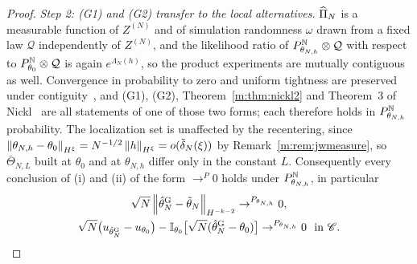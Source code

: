 \begin{proof}
\emph{Step 2: (G1) and (G2) transfer to the local alternatives.} $\widehat\Pi_N$ is a measurable function of $Z^{(N)}$ and of simulation randomness $\omega$ drawn from a fixed law $\mathcal Q$ independently of $Z^{(N)}$, and the likelihood ratio of $P^{\mathbb{N}}_{\theta_{N,h}}\otimes\mathcal Q$ with respect to $P^{\mathbb{N}}_{\theta_0}\otimes\mathcal Q$ is again $e^{\Lambda_N(h)}$, so the product experiments are mutually contiguous as well. Convergence in probability to zero and uniform tightness are preserved under contiguity~\cite[Section~6.2]{vandervaart1998}, and (G1), (G2), Theorem~\ref{m:thm:nickl2} and Theorem~3 of Nickl~\cite{nicklbvm2024} are all statements of one of those two forms; each therefore holds in $P^{\mathbb{N}}_{\theta_{N,h}}$ probability. The localization set is unaffected by the recentering, since $\left\|\theta_{N,h}-\theta_0\right\|_{H^\xi}=N^{-1/2}\left\|h\right\|_{H^\xi}=o(\tilde\delta_N(\xi))$ by Remark~\ref{m:rem:jwmeasure}, so $\bar\Theta_{N,L}$ built at $\theta_0$ and at $\theta_{N,h}$ differ only in the constant $L$. Consequently every conclusion of (i) and (ii) of the form $\to^P0$ holds under $P^{\mathbb{N}}_{\theta_{N,h}}$, in particular
\[
\begin{gathered}
\sqrt N\left\|\hat\theta^{\rm G}_N-\tilde\theta_N\right\|_{H^{-k-2}}\to^{P_{\theta_{N,h}}}0,\\
\sqrt N\big(u_{\hat\theta^{\rm G}_N}-u_{\theta_0}\big)-\mathbb{I}_{\theta_0}\big[\sqrt N(\hat\theta^{\rm G}_N-\theta_0)\big]\to^{P_{\theta_{N,h}}}0\ \text{ in }\mathscr{C} .
\end{gathered}
\]


\end{proof}
